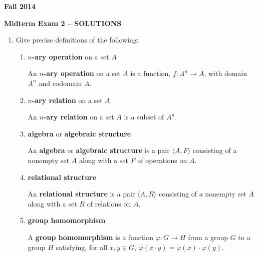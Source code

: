 \documentclass[fleqn,12pt]{article}
\newcommand{\<}{\ensuremath{\langle}}
\renewcommand{\>}{\ensuremath{\rangle}}
\begin{document}
\pagestyle{empty}
{}
\hfill {\bf Fall 2014}
\begin{center}
{\bf Midterm Exam 2 -- SOLUTIONS}
\thispagestyle{empty}
\end{center}

\bigskip

\begin{enumerate}[{\bf 1.}]
\item Give precise definitions of the following:

  \begin{enumerate}
  \item {\bf $n$-ary operation} on a set $A$

    \medskip

    An {\bf $n$-ary operation} on a set $A$ is a function,
    $f: A^n \rightarrow A$, with domain $A^n$ and codomain $A$.

    \bigskip

  \item {\bf $n$-ary relation} on a set $A$

    \medskip

    An {\bf $n$-ary relation} on a set $A$ is a subset of $A^n$.

    \bigskip

  \item {\bf algebra} or {\bf algebraic structure}

    \medskip

    An {\bf algebra} or {\bf algebraic structure} is a pair $\<A, F\>$ consisting of a
    nonempty set $A$ along with a set $F$ of operations on $A$.

    \bigskip

  \item {\bf relational structure}

    \medskip

    An {\bf relational structure} is a pair $\<A, R\>$ consisting of a
    nonempty set $A$ along with a set $R$ of relations on $A$.

    \bigskip

  \item {\bf group homomorphism}

    \medskip

    A {\bf group homomorphism} is a function 
    $\varphi: G \rightarrow H$ from a group $G$ to a group $H$ satisfying,
    for all $x, y \in G$, $\varphi(x\cdot y) = \varphi(x) \cdot \varphi(y)$.


\end{enumerate}
\end{enumerate}
\end{document}
